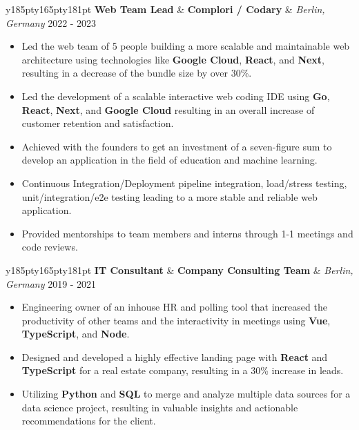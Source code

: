 \documentclass[letterpaper,11pt]{article}
\newcommand{\resumeExperience}[4]{
  \vspace{1pt}\item
    \begin{tabular}{y{185pt}y{165pt}y{181pt}}
      \textbf{#1} &
      \centering\textbf{#3} &
      \hspace*{\fill}\textit{#4} #2 \\
    \end{tabular}\vspace{-7pt}
}
\newcommand{\resumeItemListStart}{\begin{itemize}[leftmargin=*]}
\newcommand{\resumeItemListEnd}{\end{itemize}\vspace{-5pt}}
\begin{document}
    \resumeExperience
      {Web Team Lead}{2022 - 2023}
      {Complori / Codary}{Berlin, Germany}
      \resumeItemListStart
        \item
          {Led the web team of 5 people building a more scalable and maintainable web architecture using technologies like \textbf{Google Cloud}, \textbf{React}, and \textbf{Next}, resulting in a decrease of the bundle size by over 30\%.}
          \vspace{-3.5pt}
        \item
          {Led the development of a scalable interactive web coding IDE using \textbf{Go}, \textbf{React}, \textbf{Next}, and \textbf{Google Cloud} resulting in an overall increase of customer retention and satisfaction.}
          \vspace{-3.5pt}
        \item
          {Achieved with the founders to get an investment of a seven-figure sum to develop an application in the field of education and machine learning.}
          \vspace{-3.5pt}
        \item
          {Continuous Integration/Deployment pipeline integration, load/stress testing, unit/integration/e2e testing leading to a more stable and reliable web application.}
          \vspace{-3.5pt}
        \item
          {Provided mentorships to team members and interns through 1-1 meetings and code reviews.}
          \vspace{-3.5pt}
      \resumeItemListEnd
      
    \resumeExperience
      {IT Consultant}{2019 - 2021}
      {Company Consulting Team}{Berlin, Germany}
      \resumeItemListStart
        \item
          {Engineering owner of an inhouse HR and polling tool that increased the productivity of other teams and the interactivity in meetings using \textbf{Vue}, \textbf{TypeScript}, and \textbf{Node}.}
          \vspace{-3.5pt}
        \item
          {Designed and developed a highly effective landing page with \textbf{React} and \textbf{TypeScript} for a real estate company, resulting in a 30\% increase in leads.}
          \vspace{-3.5pt}
        \item
          {Utilizing \textbf{Python} and \textbf{SQL} to merge and analyze multiple data sources for a data science project, resulting in valuable insights and actionable recommendations for the client.}
      \resumeItemListEnd
\end{document}
